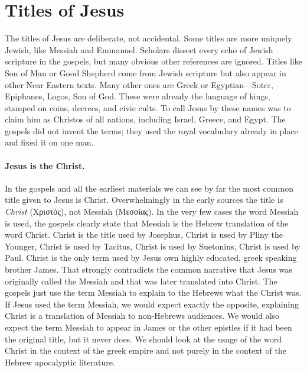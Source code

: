 \section{Titles of Jesus}\label{sec:titles-of-jesus}

The titles of Jesus are deliberate, not accidental.
Some titles are more uniquely Jewish, like Messiah and Emmanuel.
Scholars dissect every echo of Jewish scripture in the gospels, but many obvious other references are ignored.
Titles like Son of Man or Good Shepherd come from Jewish scripture but also appear in other Near Eastern texts.
Many other ones are Greek or Egyptian---Soter, Epiphanes, Logos, Son of God.
These were already the language of kings, stamped on coins, decrees, and civic cults.
To call Jesus by these names was to claim him as Christos of all nations, including Israel, Greece, and Egypt.
The gospels did not invent the terms; they used the royal vocabulary already in place and fixed it on one man.

\paragraph{Jesus is the Christ.}\label{par:jesus-is-the-christ.}
In the gospels and all the earliest materials we can see by far the most common title given to Jesus is Christ.
Overwhelmingly in the early sources the title is \emph{Christ} (Χριστός), not Messiah (Μεσσίας).
In the very few cases the word Messiah is used, the gospels clearly state that Messiah is the Hebrew translation of the word Christ.
Christ is the title used by Josephus, Christ is used by Pliny the Younger, Christ is used by Tacitus, Christ is used by Suetonius, Christ is used by Paul.
Christ is the only term used by Jesus own highly educated, greek speaking brother James.
That strongly contradicts the common narrative that Jesus was originally called the Messiah and that was later translated into Christ.
The gospels just use the term Messiah to explain to the Hebrews what the Christ was.
If Jesus used the term Messiah, we would expect exactly the opposite, explaining Christ is a translation of Messiah to non-Hebrews audiences.
We would also expect the term Messiah to appear in James or the other epistles if it had been the original title, but it never does.
We should look at the usage of the word Christ in the context of the greek empire and not purely in the context of the Hebrew apocalyptic literature.

